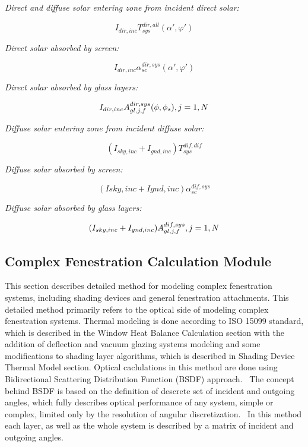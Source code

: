 \emph{Direct and diffuse solar entering zone from incident direct solar:}

\begin{equation}
{I_{dir,inc}}T_{sys}^{dir,all}\left( {\alpha ',\varphi '} \right)
\end{equation}

\emph{Direct solar absorbed by screen:}

\begin{equation}
{I_{dir,inc}}\alpha_{sc}^{dir,sys}\left( {\alpha ',\varphi '} \right)
\end{equation}

\emph{Direct solar absorbed by glass layers:}

\begin{equation}
{I_{dir,inc}}A_{gl,j,f}^{dir,sys}(\phi ,{\phi_s}),{\rm{    }}j = 1,N
\end{equation}

\emph{Diffuse solar entering zone from incident diffuse solar:}

\begin{equation}
\left( {{I_{sky,inc}} + {I_{gnd,inc}}} \right)T_{sys}^{dif,dif}
\end{equation}

\emph{Diffuse solar absorbed by screen:}

\begin{equation}
\left( {Isky,inc + Ignd,inc} \right)\alpha_{sc}^{dif,sys}
\end{equation}

\emph{Diffuse solar absorbed by glass layers:}

\begin{equation}
({I_{sky,inc}} + {I_{gnd,inc}})A_{gl,j,f}^{dif,sys},{\rm{   }}j = 1,N{\rm{ }}
\end{equation}

\subsection{Complex Fenestration Calculation Module}\label{complex-fenestration-calculation-module}

This section describes detailed method for modeling complex fenestration systems, including shading devices and general fenestration attachments. This detailed method primarily refers to the optical side of modeling complex fenestration systems. Thermal modeling is done according to ISO 15099 standard, which is described in the Window Heat Balance Calculation section with the addition of deflection and vacuum glazing systems modeling and some modifications to shading layer algorithms, which is described in Shading Device Thermal Model section. Optical caclulations in this method are done using Bidirectional Scattering Distribution Function (BSDF) approach.~ The concept behind BSDF is based on the definition of descrete set of incident and outgoing angles, which fully describes optical performance of any system, simple or complex, limited only by the resolution of angular discretization.~ In this method each layer, as well as the whole system is described by a matrix of incident and outgoing angles.

